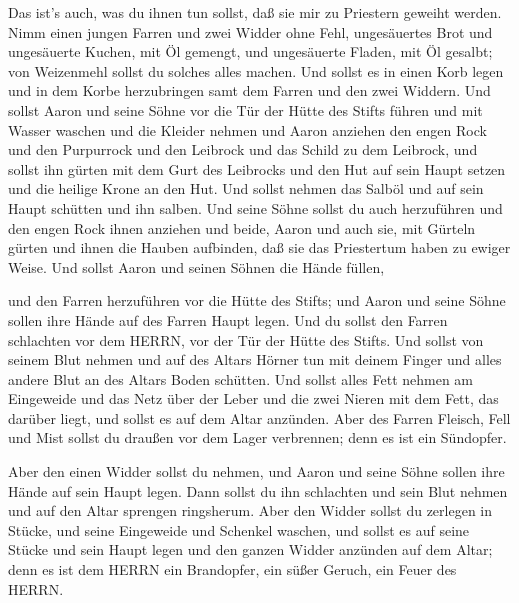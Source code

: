  Das ist's auch, was du ihnen tun sollst, daß sie mir zu
Priestern geweiht werden. Nimm einen jungen Farren und zwei Widder ohne
Fehl,  ungesäuertes Brot und ungesäuerte Kuchen, mit Öl
gemengt, und ungesäuerte Fladen, mit Öl gesalbt; von Weizenmehl sollst
du solches alles machen.  Und sollst es in einen Korb legen
und in dem Korbe herzubringen samt dem Farren und den zwei Widdern.
 Und sollst Aaron und seine Söhne vor die Tür der Hütte des
Stifts führen und mit Wasser waschen  und die Kleider nehmen
und Aaron anziehen den engen Rock und den Purpurrock und den Leibrock
und das Schild zu dem Leibrock, und sollst ihn gürten mit dem Gurt des
Leibrocks  und den Hut auf sein Haupt setzen und die heilige
Krone an den Hut.  Und sollst nehmen das Salböl und auf sein
Haupt schütten und ihn salben.  Und seine Söhne sollst du
auch herzuführen und den engen Rock ihnen anziehen  und
beide, Aaron und auch sie, mit Gürteln gürten und ihnen die Hauben
aufbinden, daß sie das Priestertum haben zu ewiger Weise. Und sollst
Aaron und seinen Söhnen die Hände füllen,

 und den Farren herzuführen vor die Hütte des Stifts; und
Aaron und seine Söhne sollen ihre Hände auf des Farren Haupt legen.
 Und du sollst den Farren schlachten vor dem HERRN, vor der
Tür der Hütte des Stifts.  Und sollst von seinem Blut
nehmen und auf des Altars Hörner tun mit deinem Finger und alles andere
Blut an des Altars Boden schütten.  Und sollst alles Fett
nehmen am Eingeweide und das Netz über der Leber und die zwei Nieren mit
dem Fett, das darüber liegt, und sollst es auf dem Altar anzünden.
 Aber des Farren Fleisch, Fell und Mist sollst du draußen
vor dem Lager verbrennen; denn es ist ein Sündopfer.

 Aber den einen Widder sollst du nehmen, und Aaron und
seine Söhne sollen ihre Hände auf sein Haupt legen.  Dann
sollst du ihn schlachten und sein Blut nehmen und auf den Altar sprengen
ringsherum.  Aber den Widder sollst du zerlegen in Stücke,
und seine Eingeweide und Schenkel waschen, und sollst es auf seine
Stücke und sein Haupt legen  und den ganzen Widder anzünden
auf dem Altar; denn es ist dem HERRN ein Brandopfer, ein süßer Geruch,
ein Feuer des HERRN.

